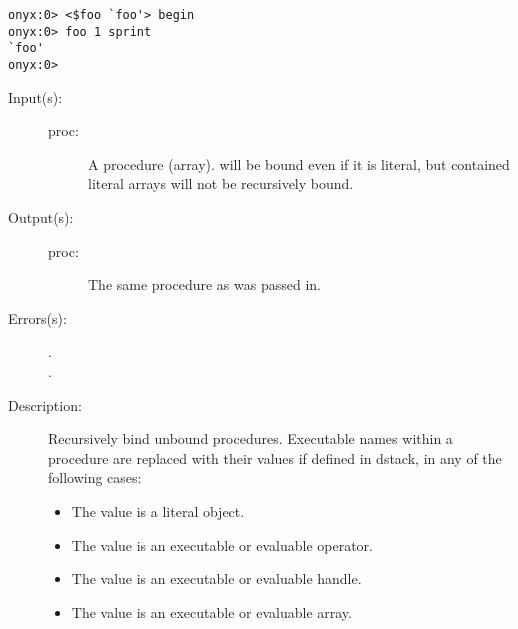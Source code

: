 \begin{description}
\begin{description}
\begin{verbatim}
onyx:0> <$foo `foo'> begin
onyx:0> foo 1 sprint
`foo'
onyx:0>
		\end{verbatim}
	\end{description}
\label{systemdict:bind}
\item[{\onyxop{proc}{bind}{proc}}: ]
	\begin{description}\item[]
	\item[Input(s): ]
		\begin{description}\item[]
		\item[proc: ]
			A procedure (array).   will be bound even if
			it is literal, but contained literal arrays will not be
			recursively bound.
		\end{description}
	\item[Output(s): ]
		\begin{description}\item[]
		\item[proc: ]
			The same procedure as was passed in.
		\end{description}
	\item[Errors(s): ]
		\begin{description}\item[]
		\item[.]
		\item[.]
		\end{description}
	\item[Description: ]
		Recursively bind unbound procedures.  Executable names within a
		procedure are replaced with their values if defined in dstack,
		in any of the following cases:
		\begin{itemize}
		\item{The value is a literal object.}
		\item{The value is an executable or evaluable operator.}
		\item{The value is an executable or evaluable handle.}
		\item{The value is an executable or evaluable array.}
		\end{itemize}


\end{description}
\end{description}
